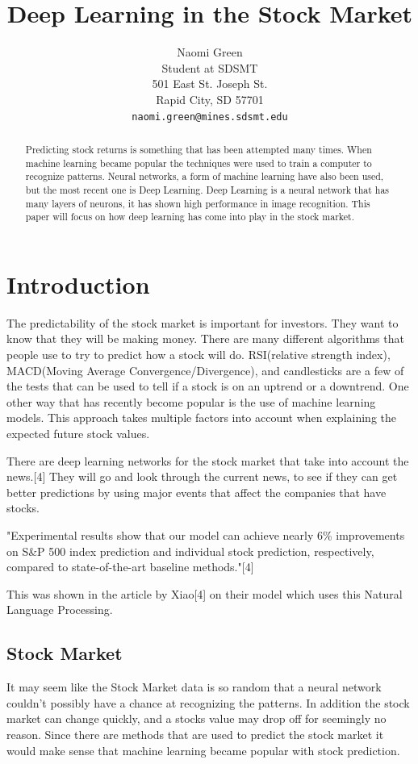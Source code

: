\documentclass{article}
\title{Deep Learning in the Stock Market}
\author{
  Naomi Green\\
  Student at SDSMT\\
  501 East St. Joseph St. \\
  Rapid City, SD 57701 \\
  \texttt{naomi.green@mines.sdsmt.edu} \\
}
\begin{document}
\maketitle

\begin{abstract}
Predicting stock returns is something that has been attempted many times. 
When machine learning became popular the techniques were used to train a computer to recognize patterns. 
Neural networks, a form of machine learning have also been used, but the most recent one is Deep Learning. 
Deep Learning is a neural network that has many layers of neurons, it has shown high performance in image recognition. 
This paper will focus on how deep learning has come into play in the stock market.
\end{abstract}

\section{Introduction}
The predictability of the stock market is important for investors.
They want to know that they will be making money.
There are many different algorithms that people use to try to predict how a stock will do. 
RSI(relative strength index), MACD(Moving Average Convergence/Divergence), and candlesticks are a few of the tests that can be used to tell if a stock is on an uptrend or a downtrend. 
One other way that has recently become popular is the use of machine learning models. 
This approach takes multiple factors into account when explaining the expected future stock values.

There are deep learning networks for the stock market that take into account the news.[4]
They will go and look through the current news, to see if they can get better predictions by using major events that affect the companies that have stocks.

"Experimental results show that our model can achieve nearly 6\% improvements on S\&P 500 index prediction and individual stock prediction, respectively, compared to state-of-the-art baseline methods."[4]

This was shown in the article by Xiao[4] on their model which uses this Natural Language Processing.


\subsection{Stock Market}
It may seem like the Stock Market data is so random that a neural network couldn't possibly have a chance at recognizing the patterns. 
In addition the stock market can change quickly, and a stocks value may drop off for seemingly no reason.
Since there are methods that are used to predict the stock market it would make sense that machine learning became popular with stock prediction.
\end{document}

